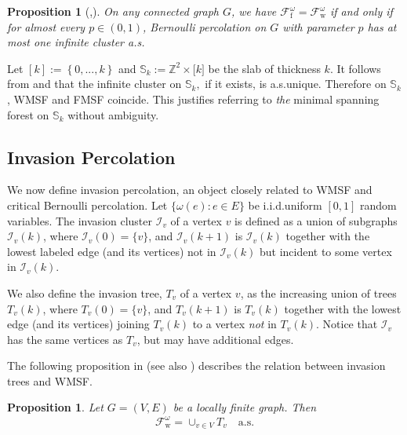 \documentclass[12pt, twoside,a4paper,reqno]{amsart}
\theoremstyle{plain}
\newtheorem{proposition}[theorem]{Proposition}
\theoremstyle{remark}
\theoremstyle{definition}
\begin{document}
\begin{proposition}[\protect\cite{LPS},\cite{Alex}]
\label{unique}On any connected graph $G$, we have $\mathcal{F}_{\mathrm f}^{\omega }=%
\mathcal{F}_{\mathrm w}^{\omega }$ if and only if for almost every $p\in \left( 0,1\right) $,
 Bernoulli percolation on $G$ with parameter $p$ has at most one infinite
cluster a.s.
\end{proposition}

Let $[k]:=\left\{ 0,...,k\right\} $ and $\mathbb S_{k}:=\mathbb{Z}%
^{2}\times \lbrack k]$ be the slab of thickness $k$. It follows from \cite%
{AKN} and \cite{BK} that the infinite cluster on $\mathbb{S}_{k},$ if it exists,
is a.s.\@ unique. Therefore on $\mathbb{S}_{k}$, WMSF and FMSF coincide. This
justifies referring to \emph{the} minimal spanning forest on $\mathbb S_k$
without ambiguity.

\subsection{Invasion Percolation} \label{inv}

We now define invasion percolation, an object closely related to WMSF and
critical Bernoulli percolation. Let $\{ \omega ( e) :e\in
  E\} $ be i.i.d.\@ uniform $[ 0,1] $ random variables. The
invasion cluster $\mathcal{I}_{v}$ of a vertex $v$ is defined as a union of
subgraphs $\mathcal{I}_{v}( k) $, where $\mathcal{I}_{v}(
  0) =\{ v\} $, and $%
\mathcal{I}_{v}( k+1) $ is $\mathcal{I}_{v}( k) $ together
with the lowest labeled edge (and its vertices) not in $\mathcal{I}_{v}( k) $ but incident to
some vertex in $\mathcal{I}_{v}( k) $.

We also define the invasion tree, $T_{v}$ of a vertex $v$, as the increasing
union of trees $T_{v}( k) $, where $T_{v}( 0) =\{
v\} $, and $T_{v}( k+1) $ is $T_{v}( k) $
together with the lowest edge (and its vertices) joining $T_{v}( k) $ to a vertex
{\it not\/} in $T_{v}( k) $. Notice that $\mathcal{I}_{v}$ has the same
vertices as $T_{v}$, but may have additional edges.

The following proposition in \cite{LPS} (see also \cite{NS}) describes the relation between
invasion trees and WMSF.

\begin{proposition} \label{invtree} Let $G=( V,E) $ be a locally
  finite graph. Then
\begin{equation*}
\mathcal{F}_{\mathrm w}^{\omega }=\cup _{v\in V}T_{v} \quad\text{a.s.}
\end{equation*}
\end{proposition}
\end{document}

